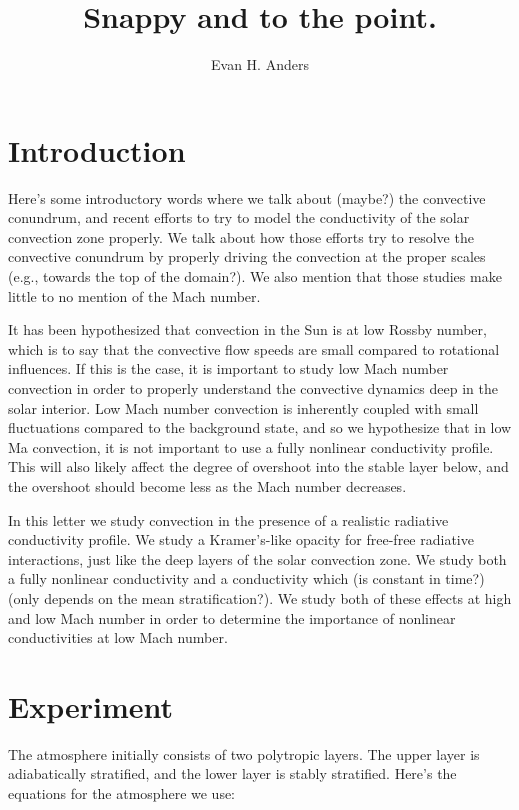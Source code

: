\documentclass[twocolumn]{aastex62}
\begin{document}
\title{Snappy and to the point.}


\author{Evan H. Anders}


\begin{abstract}
\end{abstract}


\section{Introduction} \label{sec:intro}
Here's some introductory words where we talk about (maybe?) the convective
conundrum, and recent efforts to try to model the conductivity of the solar
convection zone properly. We talk about how those efforts try to resolve the
convective conundrum by properly driving the convection at the proper scales
(e.g., towards the top of the domain?). We also mention that those studies
make little to no mention of the Mach number.

It has been hypothesized that convection in the Sun is at low Rossby number,
which is to say that the convective flow speeds are small compared to rotational 
influences. If this is the case, it is important to study low Mach number
convection in order to properly understand the convective dynamics deep in the
solar interior.  Low Mach number convection is inherently coupled with
small fluctuations compared to the background state, and so we hypothesize that
in low Ma convection, it is not important to use a fully nonlinear conductivity
profile. This will also likely affect the degree of overshoot into the stable
layer below, and the overshoot should become less as the Mach number decreases.


In this letter we study convection in the presence of a realistic radiative
conductivity profile. We study a Kramer's-like opacity for free-free radiative
interactions, just like the deep layers of the solar convection zone. We study
both a fully nonlinear conductivity and a conductivity which (is constant in time?)
(only depends on the mean stratification?). We study both of these effects at high
and low Mach number in order to determine the importance of nonlinear 
conductivities at low Mach number.

\section{Experiment} \label{sec:experiment}
The atmosphere initially consists of two polytropic layers. The upper layer
is adiabatically stratified, and the lower layer is stably stratified.
Here's the equations for the atmosphere we use:
\end{document}
